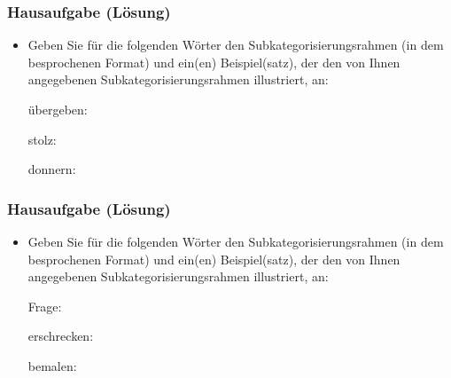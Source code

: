 {

\begin{frame}
\frametitle{Hausaufgabe (Lösung)} 

\begin{itemize}
	
	\item Geben Sie für die folgenden Wörter den Subkategorisierungsrahmen (in dem besprochenen Format) und ein(en) Beispiel(satz), der den von Ihnen angegebenen Subkategorisierungsrahmen illustriert, an:
	
	\ea übergeben: \pause {}

	\pause 
		
	\ex stolz: \pause {}
	
	\pause 
	
	\ex donnern: \pause {}
	
	\pause
	\z 
	
	
\end{itemize}

\end{frame}


\begin{frame}
\frametitle{Hausaufgabe (Lösung)} 

\begin{itemize}
	
	\item Geben Sie für die folgenden Wörter den Subkategorisierungsrahmen (in dem besprochenen Format) und ein(en) Beispiel(satz), der den von Ihnen angegebenen Subkategorisierungsrahmen illustriert, an:
	
	\ea Frage: \pause {}
	
	\pause 
	
	\ex erschrecken: \pause {}
	
	\pause 
	
	\ex bemalen: \pause {}
	
	\z 
	
	
\end{itemize}

\end{frame}
}


